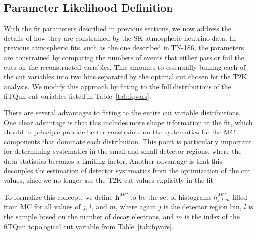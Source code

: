 {\subsection{Parameter Likelihood Definition}
\label{subsec:parlike}

With the fit parameters described in previous sections, we now address the
details of how they are constrained by the SK atmospheric neutrino data.  In
previous atmospheric fits, such as the one described in TN-186, the parameters
are constrained by comparing the numbers of events that either pass or fail the
cuts on the reconstructed variables.  This amounts to essentially binning each
of the cut variables into two bins separated by the optimal cut chosen for the
T2K analysis.  We modify this approach by fitting to the full distributions
of the fiTQun cut variables listed in Table~\ref{tab:fqvars}.

There are several advantages to fitting to the entire cut variable
distributions.  One clear advantage is that this includes more shape
information in the fit, which should in principle provide better constraints on
the systematics for the MC components that dominate each distribution. This
point is particularly important for determining systematics in the small \wall
and small \towall detector regions, where the data statistics becomes a limiting
factor.  Another advantage is that this decouples the estimation of detector
systematics from the optimization of the cut values, since we no longer use the
T2K cut values explicitly in the fit.   

To formalize this concept, we define $\mathbf{h}^{MC}$ to be the set of
histograms $h^{MC}_{j,l,m}$ filled from MC for all values of $j$, $l$, and $m$,
where again $j$  is the detector region bin, $l$ is the sample based on the
number of decay electrons, and $m$ is the index of the fiTQun topological cut
variable from Table~\ref{tab:fqvars}.

}
